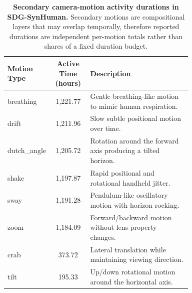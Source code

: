 \begin{table}[t]
\centering
\captionsetup{justification=raggedright, singlelinecheck=false}
\caption{\textbf{Secondary camera-motion activity durations in SDG-SynHuman.} Secondary motions are compositional layers that may overlap temporally, therefore reported durations are independent per-motion totals rather than shares of a fixed duration budget.}
\label{tab:synhuman_secondary_motion}
\small
\begin{tabular}{p{0.18\linewidth}cp{0.55\linewidth}}
\toprule
Motion Type & Active Time (hours) & Description \\
\midrule
breathing   & 1{,}221.77 & Gentle breathing-like motion to mimic human respiration. \\
drift       & 1{,}211.96 & Slow subtle positional motion over time. \\
dutch\_angle & 1{,}205.72 & Rotation around the forward axis producing a tilted horizon. \\
shake       & 1{,}197.87 & Rapid positional and rotational handheld jitter. \\
sway        & 1{,}191.28 & Pendulum-like oscillatory motion with horizon rocking. \\
zoom        & 1{,}184.09 & Forward/backward motion without lens-property changes. \\
crab        &   373.72   & Lateral translation while maintaining viewing direction. \\
tilt        &   195.33   & Up/down rotational motion around the horizontal axis. \\
\bottomrule
\end{tabular}
\end{table}